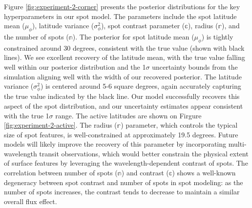 \documentclass[twocolumn]{aastex631}
\newcommand{\sabinasays}[1]{{\color{purple}#1}}
\begin{document}
Figure \ref{fig:experiment-2-corner} presents the posterior distributions for the key hyperparameters in our spot model. 
The parameters include the spot latitude mean ($\mu_\phi$), latitude variance ($\sigma^2_\phi$), spot contrast parameter 
($\mathbb{c}$), radius ($\mathbb{r}$), and the number of spots ($\mathbb{n}$).
The posterior for spot latitude mean ($\mu_\phi$) is tightly constrained around 30 degrees, consistent with 
the true value (shown with black lines). We see excellent recovery of the latitude mean, with the true value falling well 
within our posterior distribution and the 1$\sigma$ uncertainty bounds from the simulation aligning well with the width of 
our recovered posterior. The latitude variance ($\sigma^2_\phi$) is centered around 5-6 square degrees, again accurately 
capturing the true value indicated by the black line. Our model successfully recovers this aspect of the spot distribution, 
and our uncertainty estimates appear consistent with the true 1$\sigma$ range. The active latitudes are shown on Firgure \ref{fig:experiment-2-active}.
The radius ($\mathbb{r}$) parameter, which controls the typical size of spot features, is well-constrained at 
approximately 19.5 degrees. Future models will likely improve the recovery of this parameter by incorporating 
multi-wavelength transit observations, which would better constrain the physical extent of surface features by leveraging 
the wavelength-dependent contrast of spots.
The correlation between number of spots ($\mathbb{n}$) and contrast ($\mathbb{c}$) shows 
a well-known degeneracy \sabinasays{between spot contrast and number of spots} in spot modeling: as the number of spots increases, the contrast tends to decrease to 
maintain a similar overall flux effect.
\end{document}
